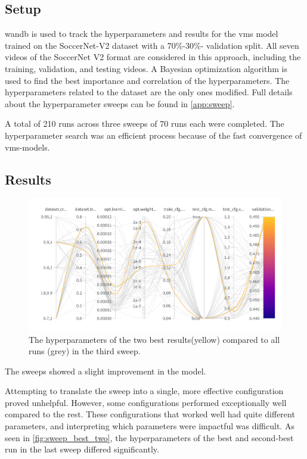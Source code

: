 \subsection{Setup}
\label{ssec:ex4_setup}

\acrlong{wandb} is used to track the hyperparameters and results for the \acrshort{vms} model trained on the SoccerNet-V2 dataset with a 70\(\%\)-30\(\%\)- validation split. All seven videos of the SoccerNet V2 format are considered in this approach, including the training, validation, and testing videos. A Bayesian optimization algorithm is used to find the best importance and correlation of the hyperparameters. The hyperparameters related to the dataset are the only ones modified. Full details about the hyperparameter sweeps can be found in \autoref{app:sweep}.

A total of 210 runs across three sweeps of 70 runs each were completed. The hyperparameter search was an efficient process because of the fast convergence of \acrshort{vms}-models. 


\subsection{Results}
\label{ssec:ex4_results}

\begin{figure}[ht]
    \centering
    \includegraphics[width=1\linewidth]{figures/sweep_two_best.png}
    \caption{The hyperparameters of the two best results(yellow) compared to all runs (grey) in the third sweep. }
    \label{fig:sweep_best_two}
\end{figure}

The sweeps showed a slight improvement in the model. 

Attempting to translate the sweep into a single, more effective configuration proved unhelpful. However, some configurations performed exceptionally well compared to the rest. These configurations that worked well had quite different parameters, and interpreting which parameters were impactful was difficult. As seen in \autoref{fig:sweep_best_two}, the hyperparameters of the best and second-best run in the last sweep differed significantly. 

